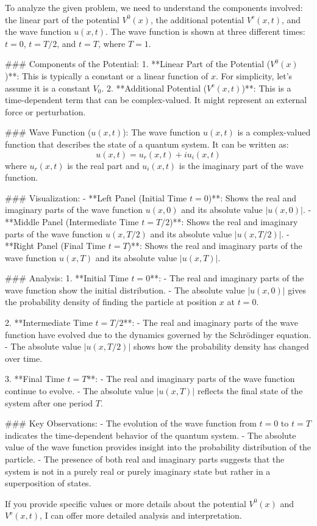 To analyze the given problem, we need to understand the components involved: the linear part of the potential \( V^0(x) \), the additional potential \( V^{\mathrm{e}}(x,t) \), and the wave function \( u(x,t) \). The wave function is shown at three different times: \( t = 0 \), \( t = T/2 \), and \( t = T \), where \( T = 1 \).

### Components of the Potential:
1. **Linear Part of the Potential (\( V^0(x) \))**: This is typically a constant or a linear function of \( x \). For simplicity, let's assume it is a constant \( V_0 \).
2. **Additional Potential (\( V^{\mathrm{e}}(x,t) \))**: This is a time-dependent term that can be complex-valued. It might represent an external force or perturbation.

### Wave Function (\( u(x,t) \)):
The wave function \( u(x,t) \) is a complex-valued function that describes the state of a quantum system. It can be written as:
\[ u(x,t) = u_r(x,t) + i u_i(x,t) \]
where \( u_r(x,t) \) is the real part and \( u_i(x,t) \) is the imaginary part of the wave function.

### Visualization:
- **Left Panel (Initial Time \( t = 0 \))**: Shows the real and imaginary parts of the wave function \( u(x,0) \) and its absolute value \( |u(x,0)| \).
- **Middle Panel (Intermediate Time \( t = T/2 \))**: Shows the real and imaginary parts of the wave function \( u(x,T/2) \) and its absolute value \( |u(x,T/2)| \).
- **Right Panel (Final Time \( t = T \))**: Shows the real and imaginary parts of the wave function \( u(x,T) \) and its absolute value \( |u(x,T)| \).

### Analysis:
1. **Initial Time \( t = 0 \)**:
   - The real and imaginary parts of the wave function show the initial distribution.
   - The absolute value \( |u(x,0)| \) gives the probability density of finding the particle at position \( x \) at \( t = 0 \).

2. **Intermediate Time \( t = T/2 \)**:
   - The real and imaginary parts of the wave function have evolved due to the dynamics governed by the Schrödinger equation.
   - The absolute value \( |u(x,T/2)| \) shows how the probability density has changed over time.

3. **Final Time \( t = T \)**:
   - The real and imaginary parts of the wave function continue to evolve.
   - The absolute value \( |u(x,T)| \) reflects the final state of the system after one period \( T \).

### Key Observations:
- The evolution of the wave function from \( t = 0 \) to \( t = T \) indicates the time-dependent behavior of the quantum system.
- The absolute value of the wave function provides insight into the probability distribution of the particle.
- The presence of both real and imaginary parts suggests that the system is not in a purely real or purely imaginary state but rather in a superposition of states.

If you provide specific values or more details about the potential \( V^0(x) \) and \( V^{\mathrm{e}}(x,t) \), I can offer more detailed analysis and interpretation.